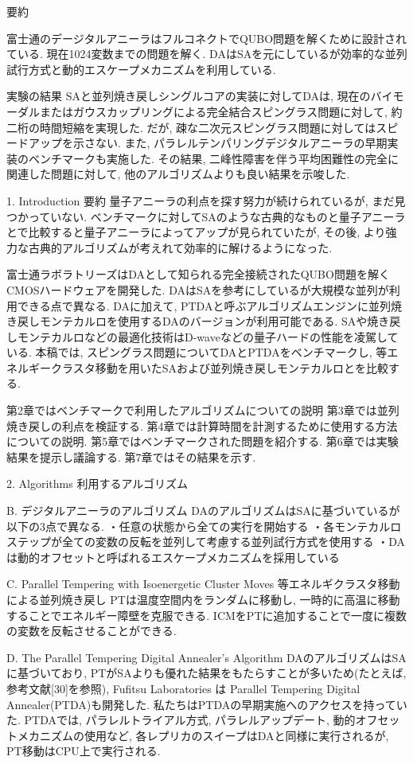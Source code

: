 要約

富士通のデージタルアニーラはフルコネクトでQUBO問題を解くために設計されている.
現在1024変数までの問題を解く. 
DAはSAを元にしているが効率的な並列試行方式と動的エスケープメカニズムを利用している. 

実験の結果
SAと並列焼き戻しシングルコアの実装に対してDAは, 現在のバイモーダルまたはガウスカップリングによる完全結合スピングラス問題に対して, 約二桁の時間短縮を実現した. 
だが, 疎な二次元スピングラス問題に対してはスピードアップを示さない. 
また, パラレルテンパリングデジタルアニーラの早期実装のベンチマークも実施した. 
その結果, 二峰性障害を伴う平均困難性の完全に関連した問題に対して, 他のアルゴリズムよりも良い結果を示唆した. 

1. Introduction 要約
量子アニーラの利点を探す努力が続けられているが, まだ見つかっていない. 
ベンチマークに対してSAのような古典的なものと量子アニーラとで比較すると量子アニーラによってアップが見られていたが, その後, より強力な古典的アルゴリズムが考えれて効率的に解けるようになった.

富士通ラボラトリーズはDAとして知られる完全接続されたQUBO問題を解くCMOSハードウェアを開発した. 
DAはSAを参考にしているが大規模な並列が利用できる点で異なる. 
DAに加えて, PTDAと呼ぶアルゴリズムエンジンに並列焼き戻しモンテカルロを使用するDAのバージョンが利用可能である. 
SAや焼き戻しモンテカルロなどの最適化技術はD-waveなどの量子ハードの性能を凌駕している. 
本稿では, スピングラス問題についてDAとPTDAをベンチマークし, 等エネルギークラスタ移動を用いたSAおよび並列焼き戻しモンテカルロとを比較する. 

第2章ではベンチマークで利用したアルゴリズムについての説明
第3章では並列焼き戻しの利点を検証する. 
第4章では計算時間を計測するために使用する方法についての説明. 
第5章ではベンチマークされた問題を紹介する. 
第6章では実験結果を提示し議論する. 
第7章ではその結果を示す. 

2. Algorithms 利用するアルゴリズム

B. デジタルアニーラのアルゴリズム
DAのアルゴリズムはSAに基づいているが以下の3点で異なる. 
・任意の状態から全ての実行を開始する
・各モンテカルロステップが全ての変数の反転を並列して考慮する並列試行方式を使用する
・DAは動的オフセットと呼ばれるエスケープメカニズムを採用している

C. Parallel Tempering with Isoenergetic Cluster Moves 等エネルギクラスタ移動による並列焼き戻し
PTは温度空間内をランダムに移動し, 一時的に高温に移動することでエネルギー障壁を克服できる. 
ICMをPTに追加することで一度に複数の変数を反転させることができる. 

D. The Parallel Tempering Digital Annealer's Algorithm
DAのアルゴリズムはSAに基づいており, PTがSAよりも優れた結果をもたらすことが多いため(たとえば, 参考文献[30]を参照), Fufitsu Laboratories は Parallel Tempering Digital Annealer(PTDA)も開発した. 
私たちはPTDAの早期実施へのアクセスを持っていた. 
PTDAでは, パラレルトライアル方式, パラレルアップデート, 動的オフセットメカニズムの使用など, 各レプリカのスイープはDAと同様に実行されるが, PT移動はCPU上で実行される. 

